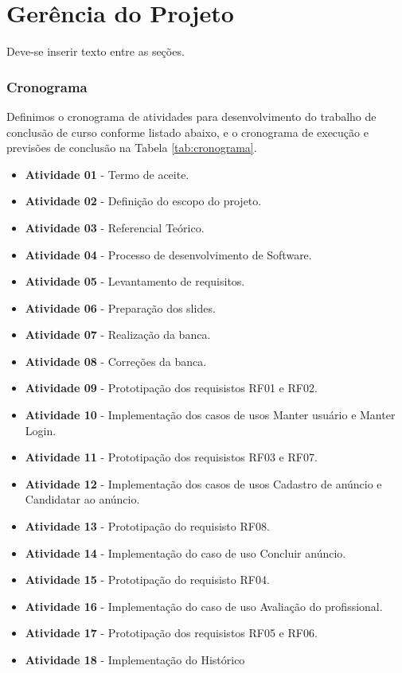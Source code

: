 \chapter{Gerência do Projeto}\label{cap:desenvolvimento}
Deve-se inserir texto entre as seções.
\subsection{Cronograma}

Definimos o cronograma de atividades para desenvolvimento do trabalho de conclusão de curso conforme listado abaixo, e o cronograma de execução e previsões de conclusão na Tabela \ref{tab:cronograma}.

\begin{itemize}
    \item \textbf{Atividade 01} - Termo de aceite.
    \item \textbf{Atividade 02} - Definição do escopo do projeto.
    \item \textbf{Atividade 03} - Referencial Teórico.
    \item \textbf{Atividade 04} - Processo de desenvolvimento de Software.
    \item \textbf{Atividade 05} - Levantamento de requisitos.
    \item \textbf{Atividade 06} - Preparação dos slides.
    \item \textbf{Atividade 07} - Realização da banca.
    \item \textbf{Atividade 08} - Correções da banca.
    \item \textbf{Atividade 09} - Prototipação dos requisistos RF01 e RF02.
    \item \textbf{Atividade 10} - Implementação dos casos de usos Manter usuário e Manter Login.
    \item \textbf{Atividade 11} - Prototipação dos requisistos RF03 e RF07.
    \item \textbf{Atividade 12} - Implementação dos casos de usos Cadastro de anúncio e Candidatar ao anúncio.
    \item \textbf{Atividade 13} - Prototipação do requisisto RF08.
    \item \textbf{Atividade 14} - Implementação do caso de uso Concluir anúncio.
    \item \textbf{Atividade 15} - Prototipação do requisisto RF04.
    \item \textbf{Atividade 16} - Implementação do caso de uso Avaliação do profissional.
    \item \textbf{Atividade 17} - Prototipação dos requisistos RF05 e RF06.
    \item \textbf{Atividade 18} - Implementação do Histórico
\end{itemize}

